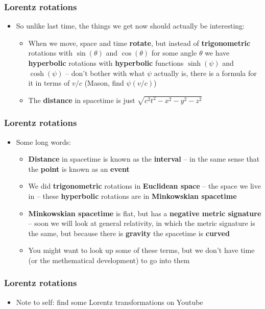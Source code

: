 \documentclass{beamer}
\begin{document}
\begin{frame}
  \frametitle{Lorentz rotations}
  \begin{itemize}
    \item<1-> So unlike last time, the things we get now should actually be interesting:
      \begin{itemize}
	\item<2-> When we move, space and time \textbf{rotate}, but instead of \textbf{trigonometric} rotations with $\sin(\theta)$ and $\cos(\theta)$ for some angle $\theta$ we have \textbf{hyperbolic} rotations with \textbf{hyperbolic} functions $\sinh(\psi)$ and $\cosh(\psi)$ -- don't bother with what $\psi$ actually is, there is a formula for it in terms of $v/c$ (Mason, find $\psi(v/c)$)
	\item<3-> The \textbf{distance} in spacetime is just $\sqrt{c^2t^2-x^2-y^2-z^2}$
      \end{itemize}
  \end{itemize}
\end{frame}

\begin{frame}
  \frametitle{Lorentz rotations}
  \begin{itemize}
    \item<1-> Some long words:
      \begin{itemize}
	\item<2-> \textbf{Distance} in spacetime is known as the \textbf{interval} -- in the same sense that the \textbf{point} is known as an \textbf{event}
	\item<3-> We did \textbf{trigonometric} rotations in \textbf{Euclidean space} -- the space we live in -- these \textbf{hyperbolic} rotations are in \textbf{Minkowskian spacetime}
	\item<4-> \textbf{Minkowskian spacetime} is flat, but has a \textbf{negative metric signature} -- soon we will look at general relativity, in which the metric signature is the same, but because there is \textbf{gravity} the spacetime is \textbf{curved}
	\item<5-> You might want to look up some of these terms, but we don't have time (or the methematical development) to go into them
      \end{itemize}
  \end{itemize}
\end{frame}

\begin{frame}
  \frametitle{Lorentz rotations}
  \begin{itemize}
    \item<1-> Note to self: find some Lorentz transformations on Youtube
  \end{itemize}
\end{frame}
\end{document}
